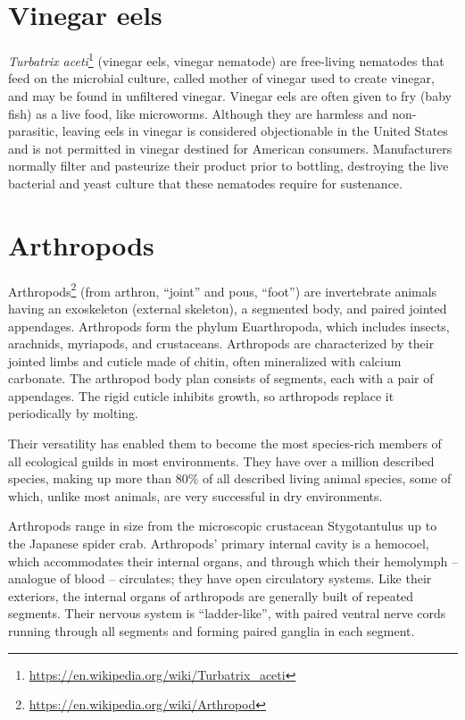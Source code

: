 \documentclass[]{book}
\let\rmarkdownfootnote\footnote%
\def\footnote{\protect\rmarkdownfootnote}
\renewcommand{\href}[2]{#2\footnote{\url{#1}}}
\theoremstyle{definition}
\theoremstyle{definition}
\theoremstyle{definition}
\theoremstyle{remark}
\begin{document}
\section{Vinegar eels}\label{vinegar-eels}

\href{https://en.wikipedia.org/wiki/Turbatrix_aceti}{\emph{Turbatrix
aceti}} (vinegar eels, vinegar nematode) are free-living nematodes that
feed on the microbial culture, called mother of vinegar used to create
vinegar, and may be found in unfiltered vinegar. Vinegar eels are often
given to fry (baby fish) as a live food, like microworms. Although they
are harmless and non-parasitic, leaving eels in vinegar is considered
objectionable in the United States and is not permitted in vinegar
destined for American consumers. Manufacturers normally filter and
pasteurize their product prior to bottling, destroying the live
bacterial and yeast culture that these nematodes require for sustenance.

\section{Arthropods}\label{arthropods}

\href{https://en.wikipedia.org/wiki/Arthropod}{Arthropods} (from
arthron, ``joint'' and pous, ``foot'') are invertebrate animals having
an exoskeleton (external skeleton), a segmented body, and paired jointed
appendages. Arthropods form the phylum Euarthropoda, which includes
insects, arachnids, myriapods, and crustaceans. Arthropods are
characterized by their jointed limbs and cuticle made of chitin, often
mineralized with calcium carbonate. The arthropod body plan consists of
segments, each with a pair of appendages. The rigid cuticle inhibits
growth, so arthropods replace it periodically by molting.

Their versatility has enabled them to become the most species-rich
members of all ecological guilds in most environments. They have over a
million described species, making up more than 80\% of all described
living animal species, some of which, unlike most animals, are very
successful in dry environments.

Arthropods range in size from the microscopic crustacean Stygotantulus
up to the Japanese spider crab. Arthropods' primary internal cavity is a
hemocoel, which accommodates their internal organs, and through which
their hemolymph -- analogue of blood -- circulates; they have open
circulatory systems. Like their exteriors, the internal organs of
arthropods are generally built of repeated segments. Their nervous
system is ``ladder-like'', with paired ventral nerve cords running
through all segments and forming paired ganglia in each segment.
\end{document}
